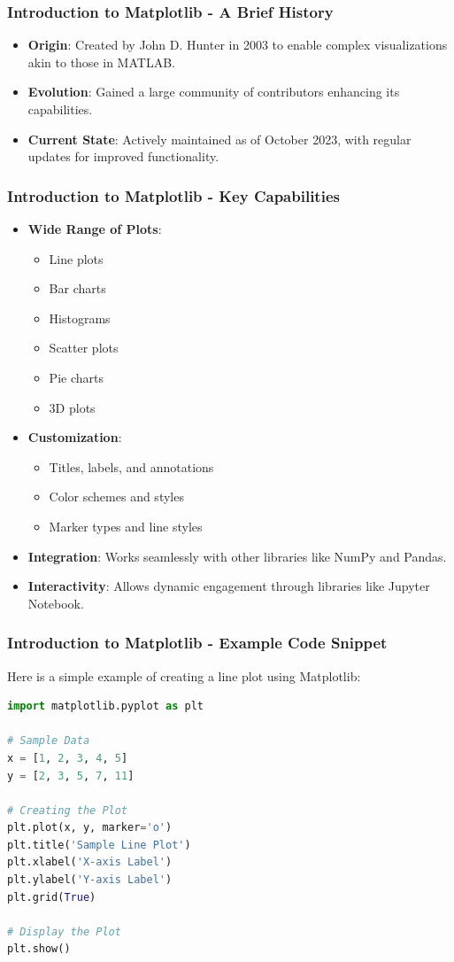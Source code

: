 \documentclass{beamer}
\begin{document}
\begin{frame}[fragile]
    \frametitle{Introduction to Matplotlib - A Brief History}
    \begin{itemize}
        \item \textbf{Origin}: Created by John D. Hunter in 2003 to enable complex visualizations akin to those in MATLAB.
        \item \textbf{Evolution}: Gained a large community of contributors enhancing its capabilities.
        \item \textbf{Current State}: Actively maintained as of October 2023, with regular updates for improved functionality.
    \end{itemize}
\end{frame}

\begin{frame}[fragile]
    \frametitle{Introduction to Matplotlib - Key Capabilities}
    \begin{itemize}
        \item \textbf{Wide Range of Plots}:
            \begin{itemize}
                \item Line plots
                \item Bar charts
                \item Histograms
                \item Scatter plots
                \item Pie charts
                \item 3D plots
            \end{itemize}
        \item \textbf{Customization}:
            \begin{itemize}
                \item Titles, labels, and annotations
                \item Color schemes and styles
                \item Marker types and line styles
            \end{itemize}
        \item \textbf{Integration}: Works seamlessly with other libraries like NumPy and Pandas.
        \item \textbf{Interactivity}: Allows dynamic engagement through libraries like Jupyter Notebook.
    \end{itemize}
\end{frame}

\begin{frame}[fragile]
    \frametitle{Introduction to Matplotlib - Example Code Snippet}
    Here is a simple example of creating a line plot using Matplotlib:
    \begin{lstlisting}[language=Python]
import matplotlib.pyplot as plt

# Sample Data
x = [1, 2, 3, 4, 5]
y = [2, 3, 5, 7, 11]

# Creating the Plot
plt.plot(x, y, marker='o')
plt.title('Sample Line Plot')
plt.xlabel('X-axis Label')
plt.ylabel('Y-axis Label')
plt.grid(True)

# Display the Plot
plt.show()
    \end{lstlisting}
\end{frame}
\end{document}

